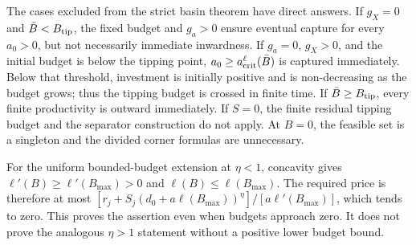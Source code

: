 \documentclass[11pt,a4paper]{article}
\theoremstyle{definition}\newtheorem{definition}{Definition}
\begin{document}
The cases excluded from the strict basin theorem have direct answers.
If $g_X=0$ and $\bar B<B_{\rm tip}$, the fixed budget and $g_a>0$
ensure eventual capture for every $a_0>0$, but not necessarily immediate
inwardness. If $g_a=0$, $g_X>0$, and the initial budget is below the
tipping point, $a_0\geq a_{\rm crit}^{\ell}(\bar B)$ is captured
immediately. Below that threshold, investment is initially positive and
is non-decreasing as the budget grows; thus the tipping budget is crossed
in finite time. If $\bar B\geq B_{\rm tip}$, every finite productivity
is outward immediately. If $S=0$, the finite residual tipping budget and
the separator construction do not apply. At $B=0$, the feasible set is
a singleton and the divided corner formulas are unnecessary.

For the uniform bounded-budget extension at $\eta<1$, concavity gives
$\ell'(B)\geq\ell'(B_{\max})>0$ and $\ell(B)\leq\ell(B_{\max})$.
The required price is therefore at most
$[r_j+S_j(d_0+a\ell(B_{\max}))^\eta]/[a\ell'(B_{\max})]$,
which tends to zero. This proves the assertion even when budgets approach
zero. It does not prove the analogous $\eta>1$ statement without a positive
lower budget bound.
\end{document}
